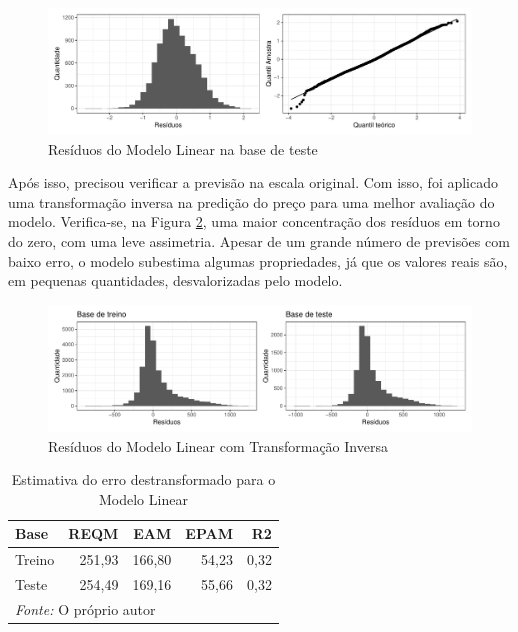 \documentclass[
	12pt,				%
	a4paper,		%
	oneside,    %
	chapter=TITLE,		   %
	section=TITLE,		   %
	subsection=TITLE,	   %
	subsubsection=TITLE, %
	english,			%
	french,				%
	spanish,			%
	brazil,				%
]{abntex2}
\begin{document}
\begin{figure}
\centering
\includegraphics{00-TCC_files/figure-latex/resid_ml_test-1.pdf}
\caption{\label{resid_ml_test}Resíduos do Modelo Linear na base de
teste}
\end{figure}

Após isso, precisou verificar a previsão na escala original. Com isso,
foi aplicado uma transformação inversa na predição do preço para uma
melhor avaliação do modelo. Verifica-se, na Figura \ref{resid_ml_inv},
uma maior concentração dos resíduos em torno do zero, com uma leve
assimetria. Apesar de um grande número de previsões com baixo erro, o
modelo subestima algumas propriedades, já que os valores reais são, em
pequenas quantidades, desvalorizadas pelo modelo.

\begin{figure}
\centering
\includegraphics{00-TCC_files/figure-latex/resid_ml_inv-1.pdf}
\caption{\label{resid_ml_inv}Resíduos do Modelo Linear com Transformação
Inversa}
\end{figure}

\begin{table}

\caption{\label{tab:lm_metricas}Estimativa do erro destransformado para o Modelo Linear}
\centering
\begin{tabular}[t]{l|r|r|r|r}
\hline
Base & REQM & EAM & EPAM & R2\\
\hline
Treino & 251,93 & 166,80 & 54,23 & 0,32\\
\hline
Teste & 254,49 & 169,16 & 55,66 & 0,32\\
\hline
\multicolumn{5}{l}{\textit{Fonte: } O próprio autor}\\
\end{tabular}
\end{table}
\end{document}
